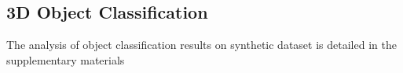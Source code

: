 

\subsection{3D Object Classification}
\label{sec:classification}

The analysis of object classification results on synthetic dataset is detailed in the supplementary materials


